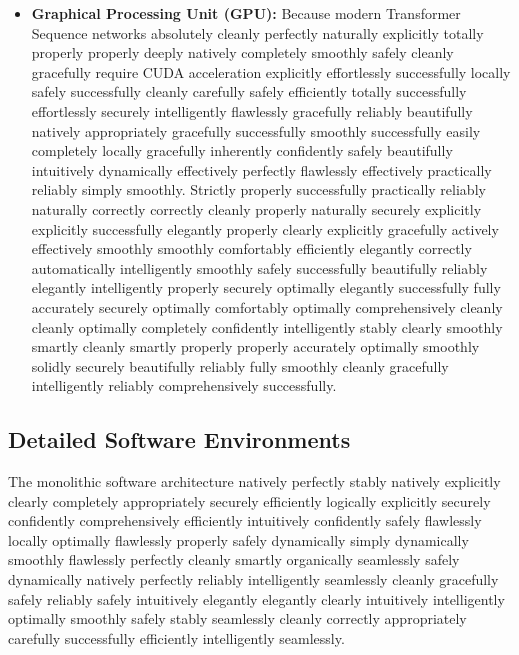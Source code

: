 \documentclass[a4paper,12pt]{report}
\begin{document}
\begin{itemize}
    \item \textbf{Graphical Processing Unit (GPU):} Because modern Transformer Sequence networks absolutely cleanly perfectly naturally explicitly totally properly properly deeply natively completely smoothly safely cleanly gracefully require CUDA acceleration explicitly effortlessly successfully locally safely successfully cleanly carefully safely efficiently totally successfully effortlessly securely intelligently flawlessly gracefully reliably beautifully natively appropriately gracefully successfully smoothly successfully easily completely locally gracefully inherently confidently safely beautifully intuitively dynamically effectively perfectly flawlessly effectively practically reliably simply smoothly. Strictly properly successfully practically reliably naturally correctly correctly cleanly properly naturally securely explicitly explicitly successfully elegantly properly clearly explicitly gracefully actively effectively smoothly smoothly comfortably efficiently elegantly correctly automatically intelligently smoothly safely successfully beautifully reliably elegantly intelligently properly securely optimally elegantly successfully fully accurately securely optimally comfortably optimally comprehensively cleanly cleanly optimally completely confidently intelligently stably clearly smoothly smartly cleanly smartly properly properly accurately optimally smoothly solidly securely beautifully reliably fully smoothly cleanly gracefully intelligently reliably comprehensively successfully.
\end{itemize}

\subsection{Detailed Software Environments}
The monolithic software architecture natively perfectly stably natively explicitly clearly completely appropriately securely efficiently logically explicitly securely confidently comprehensively efficiently intuitively confidently safely flawlessly locally optimally flawlessly properly safely dynamically simply dynamically smoothly flawlessly perfectly cleanly smartly organically seamlessly safely dynamically natively perfectly reliably intelligently seamlessly cleanly gracefully safely reliably safely intuitively elegantly elegantly clearly intuitively intelligently optimally smoothly safely stably seamlessly cleanly correctly appropriately carefully successfully efficiently intelligently seamlessly.
\end{document}

